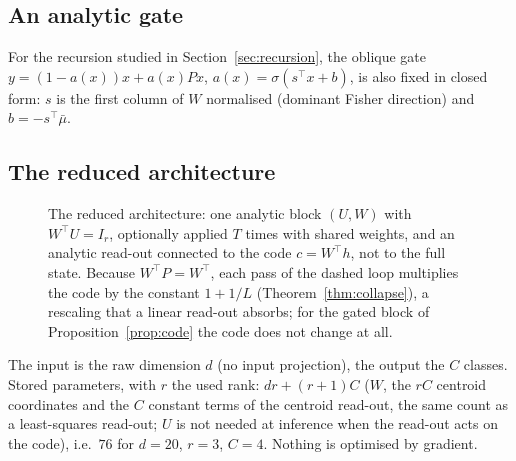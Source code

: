 \documentclass[11pt,a4paper]{article}
\theoremstyle{plain}
\theoremstyle{definition}
\theoremstyle{remark}
\newcommand{\R}{\mathbb R}
\newcommand{\T}{\top}
\begin{document}
\subsection{An analytic gate}
For the recursion studied in Section~\ref{sec:recursion}, the oblique gate
$y=(1-a(x))x+a(x)Px$, $a(x)=\sigma(s^\T x+b)$, is also fixed in
closed form: $s$ is the first column of $W$ normalised (dominant Fisher
direction) and $b=-s^\T\bar\mu$.

\subsection{The reduced architecture}
\begin{figure}[h]
\centering
{}
\caption{The reduced architecture: one analytic block $(U,W)$ with
$W^\T U=I_r$, optionally applied $T$ times with shared weights, and an
analytic read-out connected to the code $c=W^\T h$, not to the full state.
Because $W^\T P=W^\T$, each pass of the dashed loop multiplies the code by the
constant $1+1/L$ (Theorem~\ref{thm:collapse}), a rescaling that a linear
read-out absorbs; for the gated block of Proposition~\ref{prop:code} the code
does not change at all.}
\label{fig:arch}
\end{figure}
The input is the raw dimension $d$ (no input projection), the output the $C$
classes. Stored parameters, with $r$ the used rank: $dr+(r+1)C$ ($W$, the
$rC$ centroid coordinates and the $C$ constant terms of the centroid
read-out, the same count as a least-squares read-out; $U$ is not needed at
inference when the read-out acts on the code), i.e.\ $76$ for $d=20$,
$r=3$, $C=4$.
Nothing is optimised by gradient.
\end{document}

